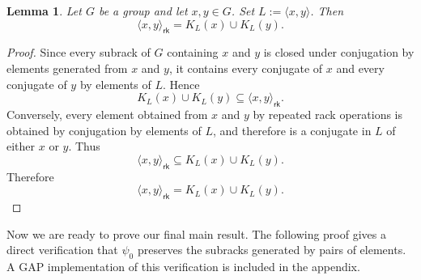 \documentclass[a4paper,12pt]{article}
\newtheorem{lem}[thm]{Lemma}
\theoremstyle{definition}
\theoremstyle{remark}
\begin{document}
\begin{lem}\label{lem:pair}
  Let $G$ be a group and let $x,y\in G$. Set $L:=\langle x,y\rangle$. Then
  $$ \langle x,y\rangle_{\mathsf{rk}}=K_L(x)\cup K_L(y). $$
\end{lem}

\begin{proof}
  Since every subrack of $G$ containing $x$ and $y$ is closed under conjugation by elements generated from $x$ and $y$, it contains every conjugate of $x$ and every conjugate of $y$ by elements of $L$. Hence
  $$ K_L(x)\cup K_L(y)\subseteq \langle x,y\rangle_{\mathsf{rk}}. $$
  Conversely, every element obtained from $x$ and $y$ by repeated rack operations is obtained by conjugation by elements of $L$, and therefore is a conjugate in $L$ of either $x$ or $y$. Thus
  $$ \langle x,y\rangle_{\mathsf{rk}}\subseteq K_L(x)\cup K_L(y). $$
  Therefore
  $$ \langle x,y\rangle_{\mathsf{rk}}=K_L(x)\cup K_L(y). $$
\end{proof}

Now we are ready to prove our final main result. The following proof gives a direct verification that $\psi_0$ preserves the subracks generated by pairs of elements. A GAP \cite{GAP4} implementation of this verification is included in the appendix.
\end{document}
